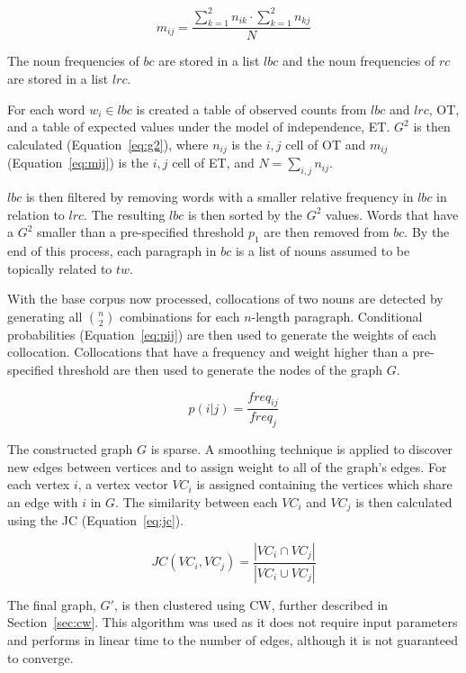 \begin{equation}\label{eq:mij}
 m_{ij} = \frac{\sum_{k=1}^2 n_{ik} \cdot \sum_{k=1}^2 n_{kj}}
               {N}
\end{equation}

The noun frequencies of $bc$ are stored in a list $lbc$ and the noun
frequencies of $rc$ are stored in a list $lrc$.

For each word $w_i \in lbc$ is created a table of observed counts from $lbc$
and $lrc$, OT, and a table of expected values under the model of independence,
ET. $G^2$ is then calculated (Equation~\ref{eq:g2}), where $n_{ij}$ is the
$i,j$ cell of OT and $m_{ij}$ (Equation~\ref{eq:mij}) is the $i,j$ cell of ET,
and $N = \sum_{i,j} n_{ij}$.

$lbc$ is then filtered by removing words with a smaller relative frequency in
$lbc$ in relation to $lrc$. The resulting $lbc$ is then sorted by the $G^2$
values. Words that have a $G^2$ smaller than a pre-specified threshold $p_1$
are then removed from $bc$. By the end of this process, each paragraph in $bc$
is a list of nouns assumed to be topically related to $tw$.

With the base corpus now processed, collocations of two nouns are detected by
generating all $\binom{n}{2}$ combinations for each $n$-length paragraph.
Conditional probabilities (Equation~\ref{eq:pij}) are then used to generate the
weights of each collocation. Collocations that have a frequency and weight
higher than a pre-specified threshold are then used to generate the nodes of the
graph $G$.

\begin{equation}\label{eq:pij}
 p(i|j) = \frac{freq_{ij}}{freq_{j}}
\end{equation}

The constructed graph $G$ is sparse. A smoothing technique is applied to
discover new edges between vertices and to assign weight to all of the graph's
edges. For each vertex $i$, a vertex vector $VC_i$ is assigned containing the
vertices which share an edge with $i$ in $G$. The similarity between each $VC_i$
and $VC_j$ is then calculated using the \ac{JC} (Equation~\ref{eq:jc}).

\begin{equation}\label{eq:jc}
 JC(VC_i, VC_j) = \frac{|VC_i \cap VC_j|}
                       {|VC_i \cup VC_j|}
\end{equation}

The final graph, $G'$, is then clustered using \ac{CW}, further described in
Section~\ref{sec:cw}. This algorithm was used as it does not require input
parameters and performs in linear time to the number of edges, although it is
not guaranteed to converge.

